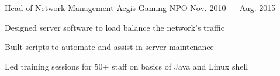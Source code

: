 \begin{entries}
  \entry%
    {Head of Network Management}%
    {Aegis Gaming NPO}%
    {}%
    {Nov. 2010 --- Aug. 2015}%
    {
      \begin{entryitems}
        \item Designed server software to load balance the network's traffic
        \item Built scripts to automate and assist in server maintenance
        \item Led training sessions for 50+ staff on basics of Java and Linux shell
      \end{entryitems}
    }
\end{entries}